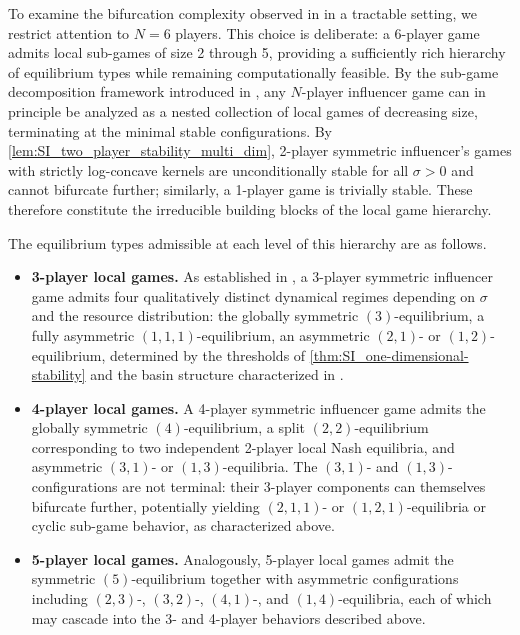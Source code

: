 \documentclass{article}
\begin{document}
                To examine the bifurcation complexity observed in  in a tractable setting, we restrict attention to $N = 6$ players. This choice is deliberate: a 6-player game admits local sub-games of size 2 through 5, providing a sufficiently rich hierarchy of equilibrium types while remaining computationally feasible. By the sub-game decomposition framework introduced in , any $N$-player influencer game can in principle be analyzed as a nested collection of local games of decreasing size, terminating at the minimal stable configurations. By \cref{lem:SI_two_player_stability_multi_dim}, 2-player symmetric influencer's games with strictly log-concave kernels are unconditionally stable for all $\sigma > 0$ and cannot bifurcate further; similarly, a 1-player game is trivially stable. These therefore constitute the irreducible building blocks of the local game hierarchy.

                The equilibrium types admissible at each level of this hierarchy are as follows.

                \begin{itemize}
                    \item \textbf{3-player local games.} As established in , a 3-player symmetric influencer game admits four qualitatively distinct dynamical regimes depending on $\sigma$ and the resource distribution: the globally symmetric $(3)$-equilibrium, a fully asymmetric $(1,1,1)$-equilibrium, an asymmetric $(2,1)$- or $(1,2)$-equilibrium, determined by the thresholds of \cref{thm:SI_one-dimensional-stability} and the basin structure characterized in .

                    \item \textbf{4-player local games.} A 4-player symmetric influencer game admits the globally symmetric $(4)$-equilibrium, a split $(2,2)$-equilibrium corresponding to two independent 2-player local Nash equilibria, and asymmetric $(3,1)$- or $(1,3)$-equilibria. The $(3,1)$- and $(1,3)$-configurations are not terminal: their 3-player components can themselves bifurcate further, potentially yielding $(2,1,1)$- or $(1,2,1)$-equilibria or cyclic sub-game behavior, as characterized above.

                    \item \textbf{5-player local games.} Analogously, 5-player local games admit the symmetric $(5)$-equilibrium together with asymmetric configurations including $(2,3)$-, $(3,2)$-, $(4,1)$-, and $(1,4)$-equilibria, each of which may cascade into the 3- and 4-player behaviors described above.
                \end{itemize}
\end{document}
